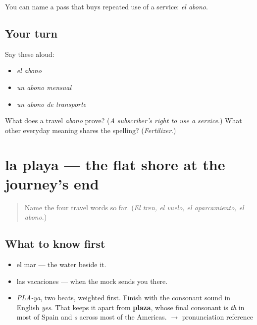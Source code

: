 \begin{grammarlens}[title={What you've built}]
You can name a pass that buys repeated use of a service: \emph{el abono}.
\end{grammarlens}

\subsection*{Your turn}
Say these aloud:

\begin{itemize}
\raggedright
  \item \emph{el abono}
  \item \emph{un abono mensual}
  \item \emph{un abono de transporte}
\end{itemize}

\begin{tcolorbox}[breakable,colback=teal!4,colframe=teal!35!black,title={Before you move on}]
What does a travel \emph{abono} prove? (\emph{A subscriber's right to use a service}.) What other everyday meaning shares the spelling? (\emph{Fertilizer}.)
\end{tcolorbox}
\section[la playa]{la playa — the flat shore at the journey's end}

\label{lesson:ES-C400-playa}



\begin{quote}
Name the four travel words so far. (\emph{El tren, el vuelo, el aparcamiento, el abono}.)
\end{quote}

\subsection*{What to know first}
\begin{itemize}
\raggedright
  \item el mar — the water beside it.
  \item las vacaciones — when the mock sends you there.
\end{itemize}

\begin{sounds}
\begin{itemize}
\raggedright
  \item \emph{PLA-ya}, two beats, weighted first. Finish with the consonant sound in English \emph{yes}. That keeps it apart from \textbf{plaza}, whose final consonant is \emph{th} in most of Spain and \emph{s} across most of the Americas. $\to$ pronunciation reference
\end{itemize}
\end{sounds}

